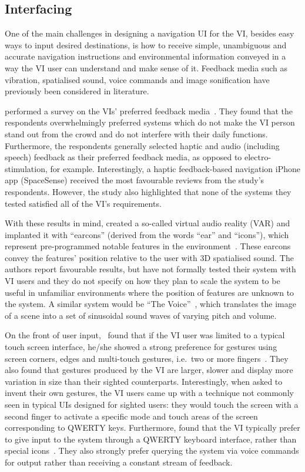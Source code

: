 \documentclass[letterpaper]{article}
\begin{document}
\subsection{Interfacing}

One of the main challenges in designing a navigation UI for the VI, besides easy ways to input desired destinations, is how to receive simple, unambiguous and accurate navigation instructions and environmental information conveyed in a way the VI user can understand and make sense of it. Feedback media such as vibration, spatialised sound, voice commands and image sonification have previously been considered in literature. 

\citeauthor{rogerio2014} performed a survey on the VIs' preferred feedback media~\cite{rogerio2014}. They found that the respondents overwhelmingly preferred systems which do not make the VI person stand out from the crowd and do not interfere with their daily functions. Furthermore, the respondents generally selected haptic and audio (including speech) feedback as their preferred feedback media, as opposed to electro-stimulation, for example. Interestingly, a haptic feedback-based navigation iPhone app (SpaceSense) received the most favourable reviews from the study's respondents. However, the study also highlighted that none of the systems they tested satisfied all of the VI's requirements.

With these results in mind, \citeauthor{frauenberger2003} created a so-called virtual audio reality (VAR) and implanted it with ``earcons'' (derived from the words ``ear'' and ``icons''), which represent pre-programmed notable features in the environment~\cite{frauenberger2003}. These earcons convey the features' position relative to the user with 3D spatialised sound. The authors report favourable results, but have not formally tested their system with VI users and they do not specify on how they plan to scale the system to be useful in unfamiliar environments where the position of features are unknown to the system. A similar system would be ``The Voice''~\cite{meijer2010}, which translates the image of a scene into a set of sinusoidal sound waves of varying pitch and volume.

On the front of user input,~\citeauthor{kane2011} found that if the VI user was limited to a typical touch screen interface, he/she showed a strong preference for gestures using screen corners, edges and multi-touch gestures, i.e.\ two or more fingers~\cite{kane2011}. They also found that gestures produced by the VI are larger, slower and display more variation in size than their sighted counterparts. Interestingly, when asked to invent their own gestures, the VI users came up with a technique not commonly seen in typical UIs designed for sighted users: they would touch the screen with a second finger to activate a specific mode and touch areas of the screen corresponding to QWERTY keys. Furthermore, \citeauthor{tian2013} found that the VI typically prefer to give input to the system through a QWERTY keyboard interface, rather than special icons~\cite{tian2013}. They also strongly prefer querying the system via voice commands for output rather than receiving a constant stream of feedback.
\end{document}
